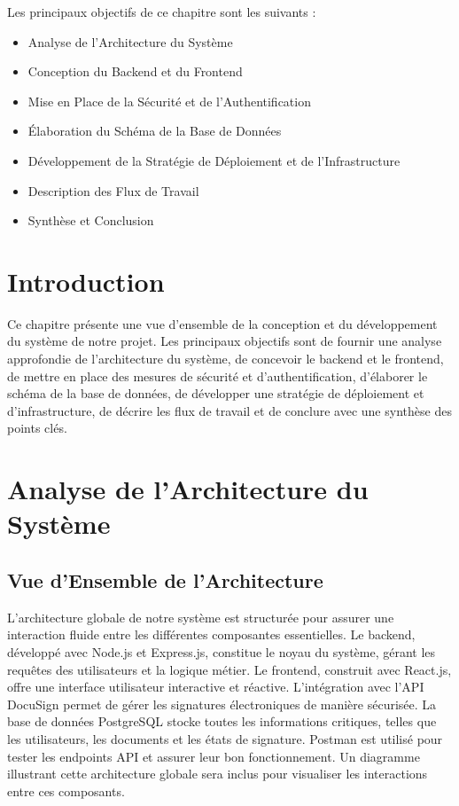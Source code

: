 
Les principaux objectifs de ce chapitre sont les suivants :
\begin{itemize}

\item Analyse de l'Architecture du Système

\item Conception du Backend et du Frontend

\item Mise en Place de la Sécurité et de l'Authentification

\item Élaboration du Schéma de la Base de Données

\item Développement de la Stratégie de Déploiement et de l'Infrastructure

\item Description des Flux de Travail

\item Synthèse et Conclusion
\end{itemize}
\newpage
\section{Introduction}
Ce chapitre présente une vue d'ensemble de la conception et du développement du système de notre projet. Les principaux objectifs sont de fournir une analyse approfondie de l'architecture du système, de concevoir le backend et le frontend, de mettre en place des mesures de sécurité et d'authentification, d'élaborer le schéma de la base de données, de développer une stratégie de déploiement et d'infrastructure, de décrire les flux de travail et de conclure avec une synthèse des points clés.

\section{ Analyse de l’Architecture du Système}
\subsection{Vue d'Ensemble de l'Architecture}
L'architecture globale de notre système est structurée pour assurer une interaction fluide entre les différentes composantes essentielles. Le backend, développé avec Node.js et Express.js, constitue le noyau du système, gérant les requêtes des utilisateurs et la logique métier. Le frontend, construit avec React.js, offre une interface utilisateur interactive et réactive. L'intégration avec l'API DocuSign permet de gérer les signatures électroniques de manière sécurisée. La base de données PostgreSQL stocke toutes les informations critiques, telles que les utilisateurs, les documents et les états de signature. Postman est utilisé pour tester les endpoints API et assurer leur bon fonctionnement. Un diagramme illustrant cette architecture globale sera inclus pour visualiser les interactions entre ces composants.



